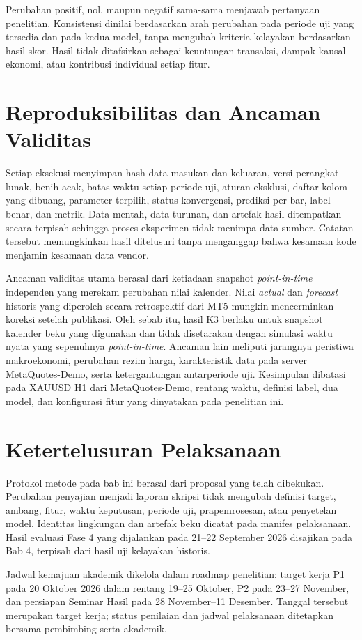 Perubahan positif, nol, maupun negatif sama-sama menjawab pertanyaan penelitian. Konsistensi dinilai berdasarkan arah perubahan pada periode uji yang tersedia dan pada kedua model, tanpa mengubah kriteria kelayakan berdasarkan hasil skor. Hasil tidak ditafsirkan sebagai keuntungan transaksi, dampak kausal ekonomi, atau kontribusi individual setiap fitur.

\section{Reproduksibilitas dan Ancaman Validitas}

Setiap eksekusi menyimpan hash data masukan dan keluaran, versi perangkat lunak, benih acak, batas waktu setiap periode uji, aturan eksklusi, daftar kolom yang dibuang, parameter terpilih, status konvergensi, prediksi per bar, label benar, dan metrik. Data mentah, data turunan, dan artefak hasil ditempatkan secara terpisah sehingga proses eksperimen tidak menimpa data sumber. Catatan tersebut memungkinkan hasil ditelusuri tanpa menganggap bahwa kesamaan kode menjamin kesamaan data vendor.

Ancaman validitas utama berasal dari ketiadaan snapshot \emph{point-in-time} independen yang merekam perubahan nilai kalender. Nilai \emph{actual} dan \emph{forecast} historis yang diperoleh secara retrospektif dari MT5 mungkin mencerminkan koreksi setelah publikasi. Oleh sebab itu, hasil K3 berlaku untuk snapshot kalender beku yang digunakan dan tidak disetarakan dengan simulasi waktu nyata yang sepenuhnya \emph{point-in-time}. Ancaman lain meliputi jarangnya peristiwa makroekonomi, perubahan rezim harga, karakteristik data pada server MetaQuotes-Demo, serta ketergantungan antarperiode uji. Kesimpulan dibatasi pada XAUUSD H1 dari MetaQuotes-Demo, rentang waktu, definisi label, dua model, dan konfigurasi fitur yang dinyatakan pada penelitian ini.

\section{Ketertelusuran Pelaksanaan}
Protokol metode pada bab ini berasal dari proposal yang telah dibekukan. Perubahan penyajian menjadi laporan skripsi tidak mengubah definisi target, ambang, fitur, waktu keputusan, periode uji, prapemrosesan, atau penyetelan model. Identitas lingkungan dan artefak beku dicatat pada manifes pelaksanaan. Hasil evaluasi Fase 4 yang dijalankan pada 21--22 September 2026 disajikan pada Bab 4, terpisah dari hasil uji kelayakan historis.

Jadwal kemajuan akademik dikelola dalam roadmap penelitian: target kerja P1 pada 20 Oktober 2026 dalam rentang 19--25 Oktober, P2 pada 23--27 November, dan persiapan Seminar Hasil pada 28 November--11 Desember. Tanggal tersebut merupakan target kerja; status penilaian dan jadwal pelaksanaan ditetapkan bersama pembimbing serta akademik.
